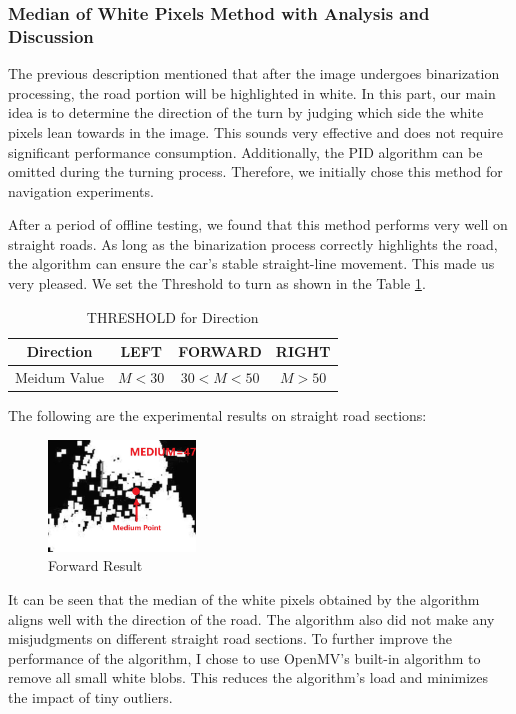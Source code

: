 \documentclass[12pt, a4paper, oneside]{report}
\begin{document}
\subsubsection{Median of White Pixels Method with Analysis and Discussion}
The previous description mentioned that after the image undergoes binarization processing, the road portion will be highlighted in white. In this part, our main idea is to determine the direction of the turn by judging which side the white pixels lean towards in the image. This sounds very effective and does not require significant performance consumption. Additionally, the PID algorithm can be omitted during the turning process. Therefore, we initially chose this method for navigation experiments.

After a period of offline testing, we found that this method performs very well on straight roads. As long as the binarization process correctly highlights the road, the algorithm can ensure the car's stable straight-line movement. This made us very pleased. We set the Threshold to turn as shown in the Table \ref{tab:threshold}. 

\begin{table}[H]
  \centering
  \begin{tabular}{|c|c|c|c|}
    \hline
    Direction & LEFT & FORWARD & RIGHT \\
    \hline
    Meidum Value & $M<30$ & $30<M<50$ & $M>50$ \\
    \hline

  \end{tabular}
    \caption{THRESHOLD for Direction}
  \label{tab:threshold}
\end{table}

The following are the experimental results on straight road sections:

\begin{figure}[H]
  \centering
  \includegraphics[width=0.35\textwidth]{pic/Tracing/Forward.jpg}
  \caption{Forward Result}
  \label{fig:example}
\end{figure}

It can be seen that the median of the white pixels obtained by the algorithm aligns well with the direction of the road. The algorithm also did not make any misjudgments on different straight road sections. To further improve the performance of the algorithm, I chose to use OpenMV's built-in algorithm to remove all small white blobs. This reduces the algorithm's load and minimizes the impact of tiny outliers.
\end{document}
